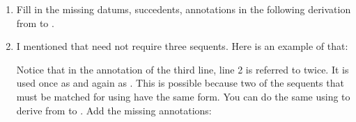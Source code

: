 \begin{enumerate}
\begin{argument*}





\end{argument*}


\item Fill in the missing datums, succedents, annotations in the following  
 derivation from  to .
 
\begin{argument*}













\end{argument*}

\item I mentioned that \disjE{} need not require three sequents. Here is an 
 example of that:

 \begin{argument*}




 \end{argument*}

 Notice that in the annotation of the third line, line 2 is referred to twice.  
 It is used once as  and again as . This is possible because two of the sequents that must be matched 
 for using \disjE{} have the same form. You can do the same using \conjI{} to 
 derive from  to 
 . Add the missing annotations:


\end{enumerate}
